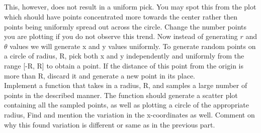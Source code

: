 \documentclass[answers]{exam}
\begin{document}
\subsection{} This, however, does not result in a uniform pick. You may spot this from the plot which should have points concentrated more towards the center rather then points being uniformly spread out across the circle. Change the number points you are plotting if you do not observe this trend. Now instead of generating $r$ and $\theta$ values we will generate x and y values uniformly. To generate random points on a
circle of radius, R, pick both x and y independently and uniformly from the range [-R, R] to obtain a point. If the distance of this point from the origin is more than R, discard it and generate a new point in its place. \\
Implement a function that takes in a radius, R, and samples a large number of points in the
described manner. The function should generate a scatter plot containing all the sampled points, as well as plotting a circle of the appropriate radius, Find and mention the variation in the x-coordinates as well. Comment on why this found variation is different or same as in the previous part.
\end{document}
